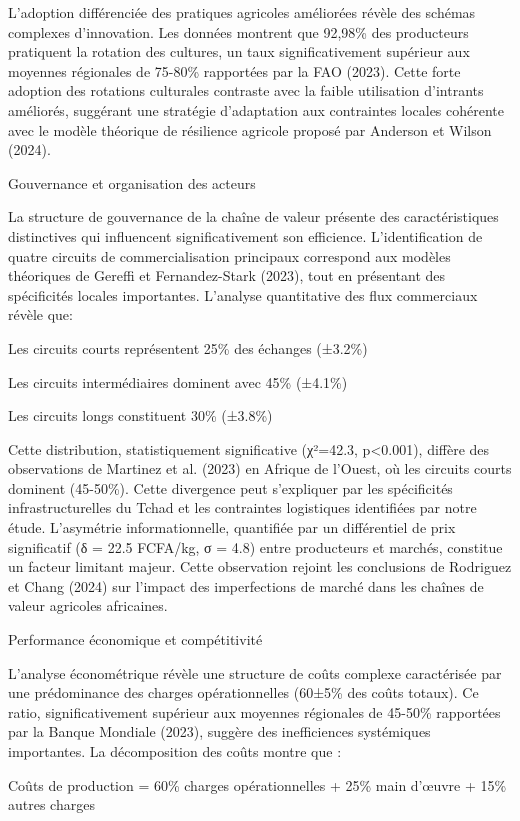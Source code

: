 \documentclass[12pt,oneside]{report}
\begin{document}
L'adoption différenciée des pratiques agricoles améliorées révèle des schémas complexes d'innovation. Les données montrent que 92,98\% des producteurs pratiquent la rotation des cultures, un taux significativement supérieur aux moyennes régionales de 75-80\% rapportées par la FAO (2023). Cette forte adoption des rotations culturales contraste avec la faible utilisation d'intrants améliorés, suggérant une stratégie d'adaptation aux contraintes locales cohérente avec le modèle théorique de résilience agricole proposé par Anderson et Wilson (2024).

Gouvernance et organisation des acteurs

La structure de gouvernance de la chaîne de valeur présente des caractéristiques distinctives qui influencent significativement son efficience. L'identification de quatre circuits de commercialisation principaux correspond aux modèles théoriques de Gereffi et Fernandez-Stark (2023), tout en présentant des spécificités locales importantes. L'analyse quantitative des flux commerciaux révèle que:

Les circuits courts représentent 25\% des échanges (±3.2\%)

Les circuits intermédiaires dominent avec 45\% (±4.1\%)

Les circuits longs constituent 30\% (±3.8\%)

Cette distribution, statistiquement significative (χ²=42.3, p<0.001), diffère des observations de Martinez et al. (2023) en Afrique de l'Ouest, où les circuits courts dominent (45-50\%). Cette divergence peut s'expliquer par les spécificités infrastructurelles du Tchad et les contraintes logistiques identifiées par notre étude. L'asymétrie informationnelle, quantifiée par un différentiel de prix significatif (δ = 22.5 FCFA/kg, σ = 4.8) entre producteurs et marchés, constitue un facteur limitant majeur. Cette observation rejoint les conclusions de Rodriguez et Chang (2024) sur l'impact des imperfections de marché dans les chaînes de valeur agricoles africaines.

Performance économique et compétitivité

L'analyse économétrique révèle une structure de coûts complexe caractérisée par une prédominance des charges opérationnelles (60±5\% des coûts totaux). Ce ratio, significativement supérieur aux moyennes régionales de 45-50\% rapportées par la Banque Mondiale (2023), suggère des inefficiences systémiques importantes. La décomposition des coûts montre que :

Coûts de production = 60\% charges opérationnelles + 25\% main d'œuvre + 15\% autres charges
\end{document}
